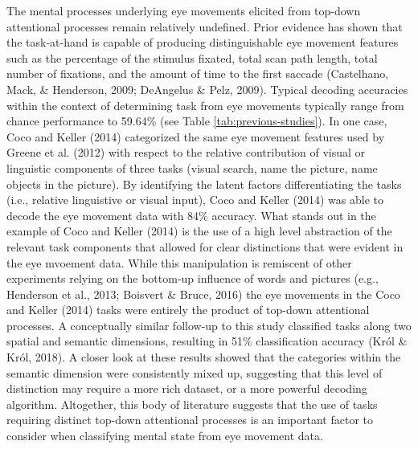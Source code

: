 \documentclass[
  english,
  man,floatsintext]{apa6}
\begin{document}
The mental processes underlying eye movements elicited from top-down attentional processes remain relatively undefined. Prior evidence has shown that the task-at-hand is capable of producing distinguishable eye movement features such as the percentage of the stimulus fixated, total scan path length, total number of fixations, and the amount of time to the first saccade (Castelhano, Mack, \& Henderson, 2009; DeAngelus \& Pelz, 2009). Typical decoding accuracies within the context of determining task from eye movements typically range from chance performance to 59.64\% (see Table \ref{tab:previous-studies}). In one case, Coco and Keller (2014) categorized the same eye movement features used by Greene et al. (2012) with respect to the relative contribution of visual or linguistic components of three tasks (visual search, name the picture, name objects in the picture). By identifying the latent factors differentiating the tasks (i.e., relative linguistive or visual input), Coco and Keller (2014) was able to decode the eye movement data with 84\% accuracy. What stands out in the example of Coco and Keller (2014) is the use of a high level abstraction of the relevant task components that allowed for clear distinctions that were evident in the eye mvoement data. While this manipulation is remiscent of other experiments relying on the bottom-up influence of words and pictures (e.g., Henderson et al., 2013; Boisvert \& Bruce, 2016) the eye movements in the Coco and Keller (2014) tasks were entirely the product of top-down attentional processes. A conceptually similar follow-up to this study classified tasks along two spatial and semantic dimensions, resulting in 51\% classification accuracy (Król \& Król, 2018). A closer look at these results showed that the categories within the semantic dimension were consistently mixed up, suggesting that this level of distinction may require a more rich dataset, or a more powerful decoding algorithm. Altogether, this body of literature suggests that the use of tasks requiring distinct top-down attentional processes is an important factor to consider when classifying mental state from eye movement data.
\end{document}
